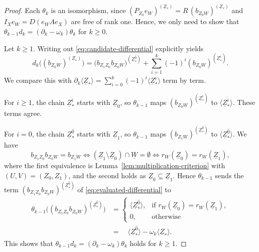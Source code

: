 \documentclass[a4paper,leqno]{amsart}
\begin{document}
\begin{proof}
Each $\theta_k$ is an isomorphism, since $(P_{Z_0}e_W)^{(\underline{Z}_\ast)}=R\,(b_{Z_0W})^{(\underline{Z}_\ast)}$ and $I_Xe_W=D(e_WAe_X)$ are free of rank one. 
Hence, we only need to show that $\theta_{k-1}d_k=(\partial_k-\omega_k)\theta_k$ for $k\geq0$.

Let $k\geq1$. Writing out \eqref{eq:candidate-differential} explicitly yields
\begin{equation}
 d_k\bigl((b_{Z_0W})^{(\underline{Z}_\ast)}\bigr)
 =\bigl(b_{Z_1Z_0}b_{Z_0W}\bigr)^{(\underline{Z}_\ast^{\widehat{0}})}
 +\sum_{i=1}^k(-1)^i
 (b_{Z_0W})^{(\underline{Z}_\ast^{\widehat{i}})}.
 \label{eq:evaluated-differential}
\end{equation}
We compare this with $\partial_k\langle\underline{Z}_\ast\rangle=\sum_{i=0}^k(-1)^i\langle\underline{Z}_\ast^{\widehat{i}}\rangle$ term by term.

For $i\geq1$, the chain $\underline{Z}_\ast^{\widehat{i}}$ starts with $\underline{Z}_0$, so $\theta_{k-1}$ maps $(b_{Z_0W})^{(\underline{Z}_\ast^{\widehat{i}})}$ to $\langle\underline{Z}_\ast^{\widehat{i}}\rangle$. These terms agree.

For $i=0$, the chain $\underline{Z}_\ast^{\widehat{0}}$ starts with $\underline{Z}_1$, so $\theta_{k-1}$ maps $(b_{Z_1W})^{(\underline{Z}_\ast^{\widehat{0}})}$ to $\langle\underline{Z}_\ast^{\widehat{0}}\rangle$. 
We have
\[
 b_{Z_1Z_0}b_{Z_0W}=b_{Z_1W}
 \iff(\underline{Z}_1\setminus\underline{Z}_0)\cap\underline{W}=\emptyset
 \iff r_W(\underline{Z}_0)=r_W(\underline{Z}_1),
\]
where the first equivalence is Lemma~\ref{lem:multiplication-criterion} with $(U,V)=(Z_0,Z_1)$, and the second holds as $\underline{Z}_0\subseteq\underline{Z}_1$. Hence $\theta_{k-1}$ sends the term $(b_{Z_1Z_0}b_{Z_0W})^{(\underline{Z}_\ast^{\widehat{0}})}$ of \eqref{eq:evaluated-differential} to
\begin{align*}
\theta_{k-1}\big( (b_{Z_1Z_0}b_{Z_0W})^{(\underline{Z}_\ast^{\widehat{0}})} \big) &= \begin{cases}
 \langle\underline{Z}_\ast^{\widehat{0}}\rangle, & \text{if }r_W(\underline{Z}_0)=r_W(\underline{Z}_1),\\
 0, & \text{otherwise}
 \end{cases}
 \\
 &=\quad
 \langle\underline{Z}_\ast^{\widehat{0}}\rangle-\omega_k\langle\underline{Z}_\ast\rangle.
\end{align*}
This shows that $\theta_{k-1}d_k=(\partial_k-\omega_k)\theta_k$ holds for $k\ge 1$.


\end{proof}
\end{document}
